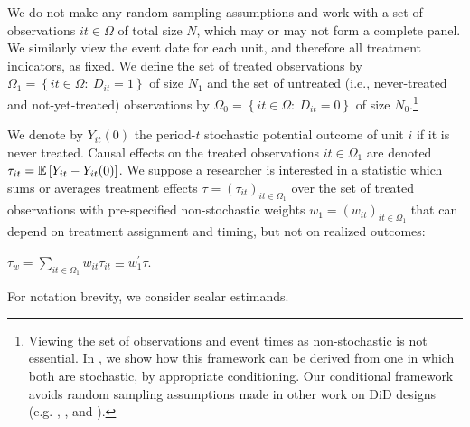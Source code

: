 \documentclass[english,11pt]{article}
\theoremstyle{plain}
\theoremstyle{plain}
\theoremstyle{plain}
\theoremstyle{plain}
\let\ref\Cref
\begin{document}
We do not make any random sampling assumptions and work with a set
of observations $it\in\Omega$ of total size $N$, which may or may
not form a complete panel. We similarly view the event date for each
unit, and therefore all treatment indicators, as fixed. We define
the set of treated observations by $\Omega_{1}=\left\{ it\in\Omega\colon\ D_{it}=1\right\} $
of size $N_{1}$ and the set of untreated (i.e., never-treated and
not-yet-treated) observations by $\Omega_{0}=\left\{ it\in\Omega\colon\ D_{it}=0\right\} $
of size $N_{0}$.\footnote{Viewing the set of observations and event times as non-stochastic
is not essential. In \ref{subsec:Stochastic-Regressors}, we show
how this framework can be derived from one in which both are stochastic,
by appropriate conditioning. Our conditional framework avoids random
sampling assumptions made in other work on DiD designs (e.g. \cite{DeChaisemartin2018},
\cite{Abraham2018}, and \cite{Callaway2018}).}

We denote by $Y_{it}(0)$ the period-$t$ stochastic potential outcome
of unit $i$ if it is never treated. Causal effects on the treated
observations $it\in\Omega_{1}$ are denoted $\tau_{it}=\mathbb{E}\left[Y_{it}-Y_{it}(0)\right]$.
We suppose a researcher is interested in a statistic which sums or
averages treatment effects $\tau=\left(\tau_{it}\right)_{it\in\Omega_{1}}$
over the set of treated observations with pre-specified non-stochastic
weights $w_{1}=\left(w_{it}\right)_{it\in\Omega_{1}}$ that can depend
on treatment assignment and timing, but not on realized outcomes:

\begin{target*}$\tau_{w}=\sum_{it\in\Omega_{1}}w_{it}\tau_{it}\equiv w_{1}^{\prime}\tau$.\end{target*}

\noindent For notation brevity, we consider scalar estimands.
\end{document}
